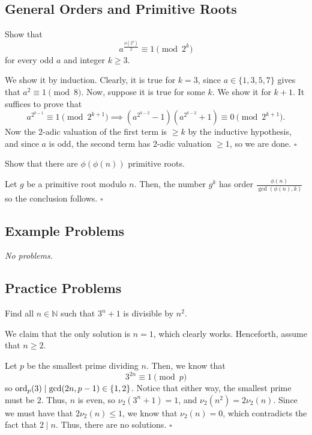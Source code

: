 \documentclass{article}
\newcommand{\noproblems}{\emph{No problems.}}
\begin{document}
\subsection{General Orders and Primitive Roots}

\begin{problem}[5.7.1]{}
Show that \[a^{\tfrac{\phi\left(2^k\right)}{2}} \equiv 1 \pmod{2^k}\] for every odd $a$ and integer $k \ge 3$.
\end{problem}

We show it by induction. Clearly, it is true for $k = 3$, since $a \in \{1, 3, 5, 7\}$ gives that $a^2 \equiv 1 \pmod{8}$. Now, suppose it is true for some $k$. We show it for $k+1$. It suffices to prove that \[a^{2^{k-1}} \equiv 1 \pmod{2^{k+1}} \implies (a^{2^{k-2}}-1)(a^{2^{k-2}}+1) \equiv 0 \pmod{2^{k+1}}.\] Now the $2$-adic valuation of the first term is $\geqslant k$ by the inductive hypothesis, and since $a$ is odd, the second term has $2$-adic valuation $\geqslant 1$, so we are done. $\square$

\begin{problem}[5.7.2]{}
Show that there are $\phi(\phi(n))$ primitive roots.
\end{problem}

Let $g$ be a primitive root modulo $n$. Then, the number $g^k$ has order $\tfrac{\phi(n)}{\gcd(\phi(n), k)}$ so the conclusion follows. $\square$

\subsection{Example Problems}

\noproblems

\newpage

\subsection{Practice Problems}

\begin{problem}[5.9.1]{}
Find all $n \in \mathbb{N}$ such that $3^n + 1$ is divisible by $n^2$.
\end{problem}

We claim that the only solution is $n = 1$, which clearly works. Henceforth, assume that $n \ge 2$.

Let $p$ be the smallest prime dividing $n$. Then, we know that \[3^{2n} \equiv 1 \pmod{p}\] so $\operatorname{ord}_p(3) \mid \gcd(2n, p-1) \in \{1, 2\}$. Notice that either way, the smallest prime must be $2$. Thus, $n$ is even, so $\nu_2(3^n+1) = 1$, and $\nu_2(n^2) = 2\nu_2(n)$. Since we must have that $2\nu_2(n) \le 1$, we know that $\nu_2(n) = 0$, which contradicts the fact that $2 \mid n$. Thus, there are no solutions. $\square$
\end{document}
